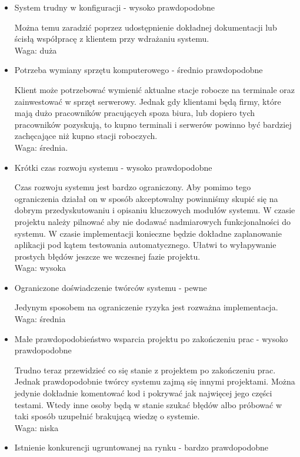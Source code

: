 \documentclass[../wstep.tex]{subfiles}
\begin{document}
\begin{itemize}
    \item System trudny w konfiguracji - wysoko prawdopodobne

          Można temu zaradzić poprzez udostępnienie dokładnej dokumentacji lub ścisłą współpracę z klientem przy wdrażaniu systemu. \\
          Waga: duża
    \item Potrzeba wymiany sprzętu komputerowego - średnio prawdopodobne

          Klient może potrzebować wymienić aktualne stacje robocze na terminale oraz zainwestować w sprzęt serwerowy. Jednak gdy klientami będą firmy, które mają dużo pracowników pracujących spoza biura, lub dopiero tych pracowników pozyskują, to kupno terminali i serwerów powinno być bardziej zachęcające niż kupno stacji roboczych.\\
          Waga: średnia.
    \item Krótki czas rozwoju systemu - wysoko prawdopodobne

          Czas rozwoju systemu jest bardzo ograniczony. Aby pomimo tego ograniczenia działał on w sposób akceptowalny powinniśmy skupić się na dobrym przedyskutowaniu i opisaniu kluczowych modułów systemu. W czasie projektu należy pilnować aby nie dodawać nadmiarowych funkcjonalności do systemu. W czasie implementacji konieczne będzie dokładne zaplanowanie aplikacji pod kątem testowania automatycznego. Ułatwi to wyłapywanie prostych błędów jeszcze we wczesnej fazie projektu.\\
          Waga: wysoka
    \item Ograniczone doświadczenie twórców systemu - pewne

          Jedynym sposobem na ograniczenie ryzyka jest rozważna implementacja.\\
          Waga: średnia
    \item Małe prawdopodobieństwo wsparcia projektu po zakończeniu prac - wysoko prawdopodobne

          Trudno teraz przewidzieć co się stanie z projektem po zakończeniu prac. Jednak prawdopodobnie twórcy systemu zajmą się innymi projektami. Można jedynie dokładnie komentować kod i pokrywać jak najwięcej jego części testami. Wtedy inne osoby będą w stanie szukać błędów albo próbować w taki sposób uzupełnić brakującą wiedzę o systemie.\\
          Waga: niska
    \item Istnienie konkurencji ugruntowanej na rynku - bardzo prawdopodobne


\end{itemize}
\end{document}
